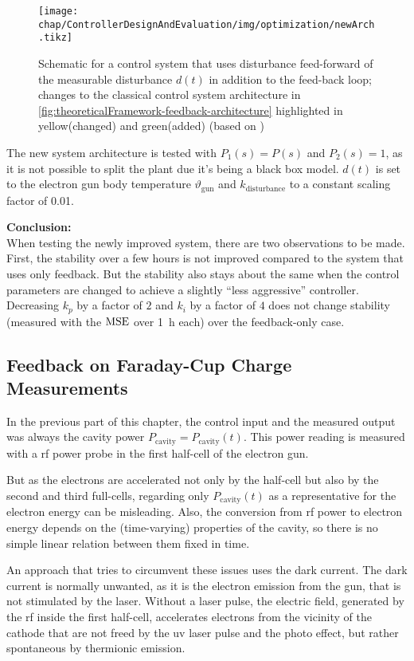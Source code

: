 \begin{figure}[tb]
	\centering
	\texttt{[image: chap/ControllerDesignAndEvaluation/img/optimization/newArch.tikz]}
	\caption[Feed-forward schematic]{Schematic for a control system that uses disturbance feed-forward of the measurable disturbance $d(t)$ in addition to the feed-back loop; changes to the classical control system architecture in \autoref{fig:theoreticalFramework-feedback-architecture} highlighted in yellow(changed) and green(added) (based on \cite[p.~221]{Foellinger2016})}
	\label{fig:controllerDesignAndEvaluation-distfeedforwardArchitecture}
\end{figure}

The new system architecture is tested with $P_1(s)=P(s)$ and $P_2(s)=1$, as it is not possible to split the plant due it's being a black box model. $d(t)$ is set to the electron gun body temperature $\vartheta_\text{gun}$ and $k_\text{disturbance}$ to a constant scaling factor of 0.01.

\textbf{Conclusion:}\\
When testing the newly improved system, there are two observations to be made. First, the stability over a few hours is not improved compared to the system that uses only feedback. But the stability also stays about the same when the control parameters are changed to achieve a slightly ``less aggressive'' controller. Decreasing $k_p$ by a factor of $2$ and $k_i$ by a factor of $4$ does not change stability (measured with the $\operatorname{MSE}$ over \SI{1}{\hour} each) over the feedback-only case.


\subsection{Feedback on Faraday-Cup Charge Measurements}
In the previous part of this chapter, the control input and the measured output was always the cavity power $P_\text{cavity}=P_\text{cavity}(t)$. This power reading is measured with a \gls{rf} power probe in the first half-cell of the electron gun.

But as the electrons are accelerated not only by the half-cell but also by the second and third full-cells, regarding only $P_\text{cavity}(t)$ as a representative for the electron energy can be misleading. Also, the conversion from \gls{rf} power to electron energy depends on the (time-varying) properties of the cavity, so there is no simple linear relation between them fixed in time.

An approach that tries to circumvent these issues uses the dark current. The dark current is normally unwanted, as it is the electron emission from the gun, that is not stimulated by the laser. Without a laser pulse, the electric field, generated by the \gls{rf} inside the first half-cell, accelerates electrons from the vicinity of the cathode that are not freed by the \gls{uv} laser pulse and the photo effect, but rather spontaneous by thermionic emission.


